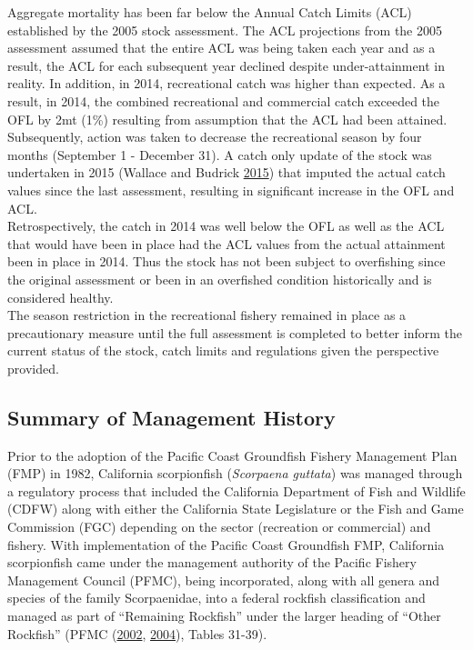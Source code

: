 \documentclass[12pt,]{article}
\begin{document}
Aggregate mortality has been far below the Annual Catch Limits (ACL)
established by the 2005 stock assessment. The ACL projections from the
2005 assessment assumed that the entire ACL was being taken each year
and as a result, the ACL for each subsequent year declined despite
under-attainment in reality. In addition, in 2014, recreational catch
was higher than expected. As a result, in 2014, the combined
recreational and commercial catch exceeded the OFL by 2mt (1\%)
resulting from assumption that the ACL had been attained. Subsequently,
action was taken to decrease the recreational season by four months
(September 1 - December 31). A catch only update of the stock was
undertaken in 2015 (Wallace and Budrick
\protect\hyperlink{ref-Wallace2015}{2015}) that imputed the actual catch
values since the last assessment, resulting in significant increase in
the OFL and ACL.\\
Retrospectively, the catch in 2014 was well below the OFL as well as the
ACL that would have been in place had the ACL values from the actual
attainment been in place in 2014. Thus the stock has not been subject to
overfishing since the original assessment or been in an overfished
condition historically and is considered healthy.\\
The season restriction in the recreational fishery remained in place as
a precautionary measure until the full assessment is completed to better
inform the current status of the stock, catch limits and regulations
given the perspective provided.

\subsection{Summary of Management
History}\label{summary-of-management-history}

Prior to the adoption of the Pacific Coast Groundfish Fishery Management
Plan (FMP) in 1982, California scorpionfish (\emph{Scorpaena guttata})
was managed through a regulatory process that included the California
Department of Fish and Wildlife (CDFW) along with either the California
State Legislature or the Fish and Game Commission (FGC) depending on the
sector (recreation or commercial) and fishery. With implementation of
the Pacific Coast Groundfish FMP, California scorpionfish came under the
management authority of the Pacific Fishery Management Council (PFMC),
being incorporated, along with all genera and species of the family
Scorpaenidae, into a federal rockfish classification and managed as part
of ``Remaining Rockfish'' under the larger heading of ``Other Rockfish''
(PFMC (\protect\hyperlink{ref-PFMC2002}{2002},
\protect\hyperlink{ref-PFMC2004}{2004}), Tables 31-39).
\end{document}
